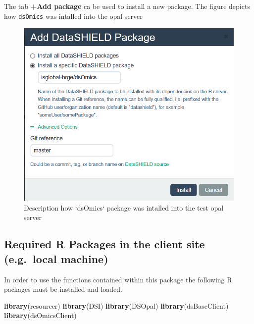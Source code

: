 \documentclass[]{article}
\newenvironment{Shaded}{\begin{snugshade}}{\end{snugshade}}
\newcommand{\KeywordTok}[1]{\textcolor[rgb]{0.13,0.29,0.53}{\textbf{#1}}}
\newcommand{\NormalTok}[1]{#1}
\begin{document}
The tab \textbf{+Add package} ca be used to install a new package. The
figure depicts how \texttt{dsOmics} was intalled into the opal server

\begin{figure}

{\centering \includegraphics[width=0.9\linewidth]{fig/add_packages_opal_2} 

}

\caption{Description how `dsOmics` package was intalled into the test opal server}\label{fig:installPackagesOpal2}
\end{figure}

\hypertarget{required-r-packages-in-the-client-site-e.g.-local-machine}{%
\subsection{Required R Packages in the client site (e.g.~local
machine)}\label{required-r-packages-in-the-client-site-e.g.-local-machine}}

In order to use the functions contained within this package the
following R packages must be installed and loaded.

\begin{Shaded}
\begin{Highlighting}[]
\KeywordTok{library}\NormalTok{(resourcer)}
\KeywordTok{library}\NormalTok{(DSI)}
\KeywordTok{library}\NormalTok{(DSOpal)}
\KeywordTok{library}\NormalTok{(dsBaseClient)}
\KeywordTok{library}\NormalTok{(dsOmicsClient)}
\end{Highlighting}
\end{Shaded}
\end{document}
